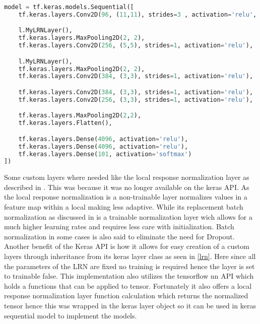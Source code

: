\begin{lstlisting}[language=Python, caption=Single Frame model implemetation, label=singleFrame]
model = tf.keras.models.Sequential([
    tf.keras.layers.Conv2D(96, (11,11), strides=3 , activation='relu', input_shape=(170, 170, 3)),

    l.MyLRNLayer(),
    tf.keras.layers.MaxPooling2D(2, 2),
    tf.keras.layers.Conv2D(256, (5,5), strides=1, activation='relu'),

    l.MyLRNLayer(),
    tf.keras.layers.MaxPooling2D(2, 2),
    tf.keras.layers.Conv2D(384, (3,3), strides=1, activation='relu'),

    tf.keras.layers.Conv2D(384, (3,3), strides=1, activation='relu'),
    tf.keras.layers.Conv2D(256, (3,3), strides=1, activation='relu'),

    tf.keras.layers.MaxPooling2D(2,2),
    tf.keras.layers.Flatten(),

    tf.keras.layers.Dense(4096, activation='relu'),
    tf.keras.layers.Dense(4096, activation='relu'),
    tf.keras.layers.Dense(101, activation='softmax')
])
\end{lstlisting}

Some custom layers where needed like the local response normalization layer as described in \citep{NIPS2012_4824}. This was because it was no longer available on the keras API. As the local response normalization is a non-trainable layer normalizes values in a feature map within a local making less adaptive. While its replacement batch normalization as discussed in \citep{ioffe2015batch} is a trainable normalization layer wich allows for a much higher learning rates and requires less care with initialization. Batch normalization in some cases is also said to eliminate the need for Dropout. 
Another benefit of the Keras API is how it allows for easy creation of a custom layers through inheritance from its keras layer class as seen in \ref{lrn}. Here since all the parameters of the LRN are fixed no training is required hence the layer is set to trainable false.
This implementation also utilizes the tensorflow nn API which holds a functions that can be applied to tensor. Fortunately it also offers a local response normalization layer function calculation which returns the normalized tensor hence this was wrapped in the keras layer object so it can be used in  keras sequential model to implement the models.

